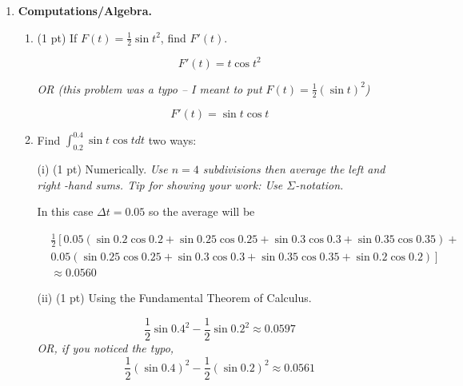 \documentclass[11pt,letterpaper]{article}
\begin{document}
\begin{enumerate}
 (1 pt) The height (above the x-axis) of the
point P.

\[f(a)\]

\vspace{1.0pc}
 (1 pt)  The slope of the line M.

\[f'(a)\]

\vspace{1.0pc}
 (1 pt)  The size of the area A.

\[\int_0^af(x)dx\]

\vspace{1.0pc}
 (1 pt)  The height of the line L.

\[\frac{4}{b-a}\]   

\vspace{.05pc}
\emph{OR (for extra credit)} 

\[\frac{\int\limits_a^bf(x)dx}{b-a}\]

\vspace{0.5pc}
\item \textbf{Computations/Algebra.}  
\begin{enumerate}
\item  (1 pt) If $F(t)=\frac{1}{2}\sin{t^2}$, find $F'(t)$.

\[F'(t)=t\cos{t^2}\]

\vspace{0.5pc}
\emph{OR (this problem was a typo -- I meant to put $F(t)=\frac{1}{2}\left(\sin{t}\right)^2$)} 

\[F'(t)=\sin{t}\cos{t}\]

\vspace{1pc}
\item Find $\int_{0.2}^{0.4}\sin{t}\cos{t}dt$ two ways: 

\vspace{.5pc}
(i)  (1 pt) Numerically.  \emph{Use $n=4$ subdivisions then average the left and right -hand sums.  Tip for showing your work:  Use $\Sigma $-notation.}

\vspace{1pc}
In this case $\Delta t=0.05$ so the average will be

\begin{eqnarray*}
& \frac{1}{2}\left[0.05\left(\sin{0.2}\cos{0.2}+\sin{0.25}\cos{0.25}+\sin{0.3}\cos{0.3}+\sin{0.35}\cos{0.35}\right)+\right. \\
& \left.0.05\left(\sin{0.25}\cos{0.25}+\sin{0.3}\cos{0.3}+\sin{0.35}\cos{0.35}+\sin{0.2}\cos{0.2}\right)\right] \\
& \approx 0.0560
\end{eqnarray*}


\vspace{1pc}
(ii)  (1 pt) Using the Fundamental Theorem of Calculus.

\[\frac{1}{2}\sin{0.4^2}-\frac{1}{2}\sin{0.2^2}\approx 0.0597\]
\emph{OR, if you noticed the typo,}
\[\frac{1}{2}\left(\sin{0.4}\right)^2-\frac{1}{2}\left(\sin{0.2}\right)^2 \approx 0.0561\] 

\end{enumerate}

\end{enumerate}



\end{document}
